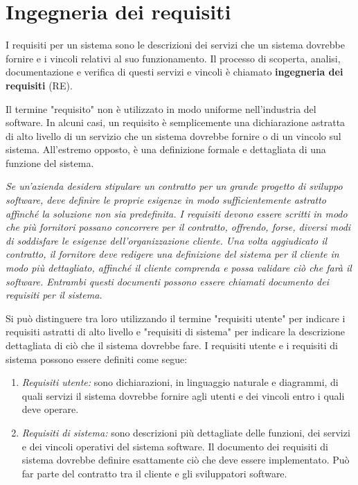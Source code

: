 \chapter{Ingegneria dei requisiti}
\begin{redbar}
I requisiti per un sistema sono le descrizioni dei servizi che un sistema dovrebbe fornire e i vincoli relativi al suo funzionamento. Il processo di scoperta, analisi, documentazione e verifica di questi servizi e vincoli è chiamato \textbf{ingegneria dei requisiti} (RE).
\end{redbar}

Il termine "requisito" non è utilizzato in modo uniforme nell'industria del software. In alcuni casi, un requisito è semplicemente una dichiarazione astratta di alto livello di un servizio che un sistema dovrebbe fornire o di un vincolo sul sistema. All'estremo opposto, è una definizione formale e dettagliata di una funzione del sistema.

\begin{center}
\begin{minipage}{0.9\textwidth}
\textit{Se un'azienda desidera stipulare un contratto per un grande progetto di sviluppo software, deve definire le proprie esigenze in modo sufficientemente astratto affinché la soluzione non sia predefinita. I requisiti devono essere scritti in modo che più fornitori possano concorrere per il contratto, offrendo, forse, diversi modi di soddisfare le esigenze dell'organizzazione cliente. Una volta aggiudicato il contratto, il fornitore deve redigere una definizione del sistema per il cliente in modo più dettagliato, affinché il cliente comprenda e possa validare ciò che farà il software. Entrambi questi documenti possono essere chiamati documento dei requisiti per il sistema.}
\end{minipage}
\end{center}
Si può distinguere tra loro utilizzando il termine "requisiti utente" per indicare i requisiti astratti di alto livello e "requisiti di sistema" per indicare la descrizione dettagliata di ciò che il sistema dovrebbe fare. I requisiti utente e i requisiti di sistema possono essere definiti come segue:
\begin{enumerate}
    \item \textit{Requisiti utente:} sono dichiarazioni, in linguaggio naturale e diagrammi, di quali servizi il sistema dovrebbe fornire agli utenti e dei vincoli entro i quali deve operare.
    \item \textit{Requisiti di sistema:} sono descrizioni più dettagliate delle funzioni, dei servizi e dei vincoli operativi del sistema software. Il documento dei requisiti di sistema dovrebbe definire esattamente ciò che deve essere implementato. Può far parte del contratto tra il cliente e gli sviluppatori software.
\end{enumerate}

